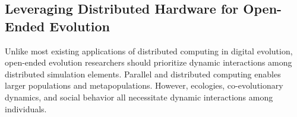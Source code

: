 \subsection{Leveraging Distributed Hardware for Open-Ended Evolution}



Unlike most existing applications of distributed computing in digital evolution, open-ended evolution researchers should prioritize dynamic interactions among distributed simulation elements.
Parallel and distributed computing enables larger populations and metapopulations.
However, ecologies, co-evolutionary dynamics, and social behavior all necessitate dynamic interactions among individuals.

